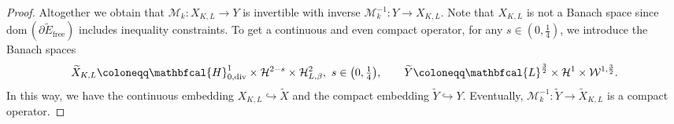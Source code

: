 \documentclass[11pt,reqno]{amsart}
\theoremstyle{remark}
\numberwithin{equation}{section}
\newcommand{\Div}{\textnormal{div}}
\newcommand{\emb}{\hookrightarrow}
\newcommand{\free}{\mathrm{free}}
\begin{document}
\begin{proof}
    Altogether we obtain that $\mathcal{M}_k:X_{K,L}\rightarrow Y$ is invertible with inverse $\mathcal{M}_k^{-1}:Y\rightarrow X_{K,L}$. Note that $X_{K,L}$ is not a Banach space since $\mathrm{dom}\,(\partial \widetilde E_\free)$ includes inequality constraints.
    To get a continuous and even compact operator, for any $s\in(0,\frac14)$, we introduce the Banach spaces
    \begin{align*}
        \widetilde{X}_{K,L} \coloneqq \mathbfcal{H}^1_{0,\Div}\times\mathcal{H}^{2-s}\times\mathcal{H}^2_{L,\beta}, \ s\in\big(0,\tfrac14\big), \qquad  \widetilde{Y} \coloneqq \mathbfcal{L}^{\frac32}\times\mathcal{H}^1\times\mathcal{W}^{1,\frac32}.
    \end{align*}
    In this way, we have the continuous embedding $X_{K,L}\emb\widetilde{X}$ and the compact embedding $\widetilde{Y}\emb Y$. Eventually, $\mathcal{M}_k^{-1}:\widetilde{Y}\rightarrow\widetilde{X}_{K,L}$ is a compact operator. 
    

\end{proof}
\end{document}
